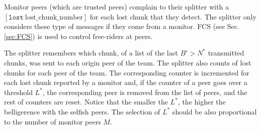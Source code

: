 

\label{sec:free_riding_control}

Monitor peers (which are trusted peers) complain to their splitter
with a $[\mathtt{lost}~\text{lost\_chunk\_number}]$ for each lost
chunk that they detect. The splitter only considers these type of
messages if they come from a monitor. FCS (see Sec. \ref{sec:FCS}) is
used to control free-riders at peers.

The splitter remembers which chunk, of a list of the last $B'>N^*$
transmitted chunks, was sent to each origin peer of the team. The
splitter also counts of lost chunks for each peer of the team. The
corresponding counter is incremented for each lost chunk reported by a
monitor and, if the counter of a peer goes over a threshold $L^*$, the
corresponding peer is removed from the list of peers, and the rest of
counters are reset. Notice that the smaller the $L^*$, the higher the
belligerence with the selfish peers. The selection of $L^*$ should be
also proportional to the number of monitor peers $M$.
